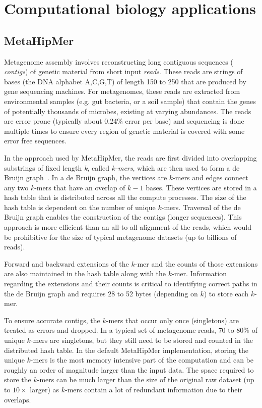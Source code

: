 
\section{Computational biology applications}

\subsection{MetaHipMer}

Metagenome assembly involves reconstructing long contiguous sequences ({\it
contigs}) of genetic material from short input {\it reads}. These reads are
strings of bases (the DNA alphabet A,C,G,T) of length 150 to 250 that are
produced by gene sequencing machines.  For metagenomes, these reads are
extracted from environmental samples (e.g. gut bacteria, or a soil sample) that
contain the genes of potentially thousands of microbes, existing at varying
abundances.  The reads are error prone (typically about 0.24\% error per base)
and sequencing is done multiple times to ensure every region of genetic material
is covered with some error free sequences.

In the approach used by MetaHipMer, the reads are first divided into overlapping
substrings of fixed length {\it k}, called {\it $k$-mers}, which are then used
to form a de Bruijn graph~\cite{CompeauPeTe11}. In a de Bruijn graph, the
vertices are $k$-mers and edges connect any two $k$-mers that have an overlap of
$k-1$ bases. These vertices are stored in a hash table that is distributed
across all the compute processes.  The size of the hash table is dependent on
the number of unique $k$-mers.  Traversal of the de Bruijn graph enables the
construction of the contigs (longer sequences).  This approach is more efficient
than an all-to-all alignment of the reads, which would be prohibitive for the
size of typical metagenome datasets (up to billions of reads).

Forward and backward extensions of the $k$-mer and the counts of those
extensions are also maintained in the hash table along with the $k$-mer.
Information regarding the extensions and their counts is critical to identifying
correct paths in the de Bruijn graph and requires 28 to 52 bytes (depending on
$k$) to store each $k$-mer.

To ensure accurate contigs, the $k$-mers that occur only once (singletons) are
treated as errors and dropped. In a typical set of metagenome reads, 70 to 80\%
of unique $k$-mers are singletons, but they still need to be stored and counted
in the distributed hash table. In the default MetaHipMer implementation, storing
the unique $k$-mers is the most memory intensive part of the computation and can
be roughly an order of magnitude larger than the input data.  The space required
to store the $k$-mers can be much larger than the size of the original raw
dataset (up to $10\times$ larger) as $k$-mers contain a lot of redundant
information due to their overlaps.


